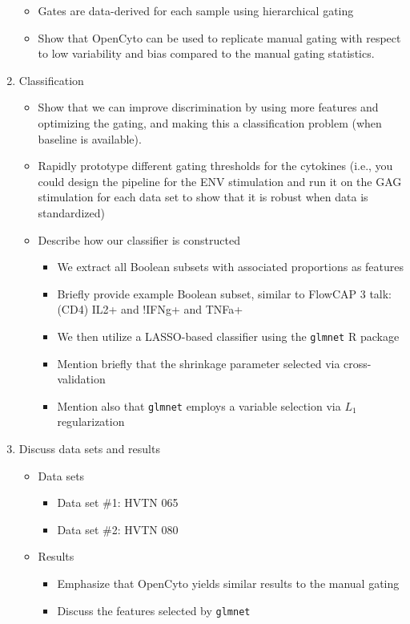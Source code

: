 \documentclass[12pt]{article}
\begin{document}
\begin{enumerate}
\begin{itemize}
		\item Gates are data-derived for each sample using hierarchical gating
		\item Show that OpenCyto can be used to replicate manual gating with respect to low variability and bias compared to the 
manual gating statistics.
	\end{itemize}
	\item Classification
	\begin{itemize}
		\item Show that we can improve discrimination by using more features and optimizing the gating, and making this a
classification problem (when baseline is available).
		\item Rapidly prototype different gating thresholds for the cytokines (i.e., you could design the pipeline for the ENV stimulation and run it on the GAG stimulation for each data set to show that it is robust when data is standardized)
		\item Describe how our classifier is constructed
		\begin{itemize}
			\item We extract all Boolean subsets with associated proportions as features
			\item Briefly provide example Boolean subset, similar to FlowCAP 3 talk: (CD4) IL2+ and !IFNg+ and TNFa+
			\item We then utilize a LASSO-based classifier using the {\tt glmnet} R package
			\item Mention briefly that the shrinkage parameter selected via cross-validation
			\item Mention also that {\tt glmnet} employs a variable selection via $L_1$ regularization
		\end{itemize}
	\end{itemize}
	\item Discuss data sets and results
		\begin{itemize}
		\item Data sets
		\begin{itemize}
			\item Data set \#1: HVTN 065
			\item Data set \#2: HVTN 080
		\end{itemize}
		\item Results
		\begin{itemize}
			\item Emphasize that OpenCyto yields similar results to the manual gating
			\item Discuss the features selected by {\tt glmnet}

\end{itemize}
\end{itemize}
\end{enumerate}
\end{document}
